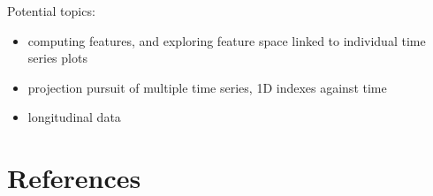 \documentclass[
  letterpaper,
]{book}
\providecommand{\tightlist}{%
  \setlength{\itemsep}{0pt}\setlength{\parskip}{0pt}}\usepackage{longtable,booktabs,array}
\begin{document}
Potential topics:

\begin{itemize}
\tightlist
\item
  computing features, and exploring feature space linked to individual
  time series plots
\item
  projection pursuit of multiple time series, 1D indexes against time
\item
  longitudinal data
\end{itemize}


\hypertarget{references}{%
\chapter*{References}\label{references}}

\end{document}
